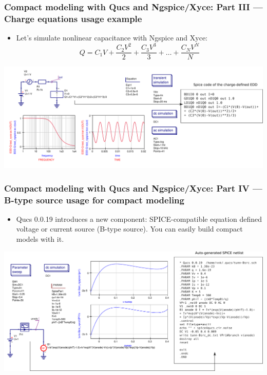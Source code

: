 \documentclass[9pt]{beamer}
\begin{document}
 \begin{frame}
  \frametitle{Compact modeling with Qucs and Ngspice/Xyce: Part III --- Charge 
equations usage example}

\begin{itemize}
 \item Let's simulate nonlinear capacitance with Ngspice and Xyce:
 \begin{equation}
 Q = C_1V + \frac{C_2V^2}{2} + \frac{C_3V^3}{3} + \ldots + \frac{C_NV^N}{N}
\end{equation}
\end{itemize}

 


\includegraphics[width=1.05\textwidth]{img/CapTest.pdf}

 \end{frame}

 \begin{frame}
    \frametitle{Compact modeling with Qucs and Ngspice/Xyce: Part IV --- 
B-type source usage for compact modeling}

\begin{itemize}
 \item Qucs 0.0.19 introduces a new component: SPICE-compatible equation 
defined voltage or current source (B-type source). You can easily build compact 
models with it.
\end{itemize}


\includegraphics[width=1.05\textwidth]{img/tunn-Bsrc.pdf}


 \end{frame}
\end{document}
